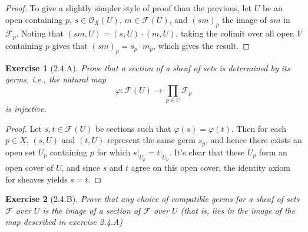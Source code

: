 \documentclass{amsart}
\newtheorem*{exercise*}{Exercise}
\begin{document}
\begin{proof}
    To give a slightly simpler style of proof than the previous, let $U$ be an
    open containing $p$, $s \in \mathcal{O}_X(U)$, $m \in \mathcal{F}(U)$, and $(sm)_p$ the image of $sm$ in $\mathcal{F}_p$. Noting that $(sm, U) = (s, U)\cdot(m, U)$, taking
    the colimit over all open $V$ containing $p$ gives that $(sm)_p = s_p \cdot m_p$,
    which gives the result.
\end{proof}

\vspace{0.1in}


\begin{exercise*}[2.4.A]
    Prove that a section of a sheaf of sets is determined by its germs, i.e., the natural map
    \[\varphi: \mathcal{F}(U) \to \prod_{p \in U}\mathcal{F}_p\]
    is injective.
\end{exercise*}

\begin{proof}
    Let $s,t \in \mathcal{F}(U)$ be sections such that $\varphi(s) = \varphi(t)$. Then for each $p \in X$, $(s, U)$ and $(t, U)$ represent the same germ $s_p$, and hence there exists
    an open set $U_p$ containing $p$ for which $s\vert_{U_p} = t\vert_{U_p}$. It's clear that these $U_p$ form an open cover of $U$, and since $s$ and $t$ agree on this open cover,
    the identity axiom for sheaves yields $s = t$.
\end{proof}

\vspace{0.1in}


\begin{exercise*}[2.4.B]
    Prove that any choice of compatible germs for a sheaf of sets $\mathcal{F}$ over $U$
    is the image of a section of $\mathcal{F}$ over $U$ (that is, lies in the image of the
    map described in exercise 2.4.A)
\end{exercise*}
\end{document}
